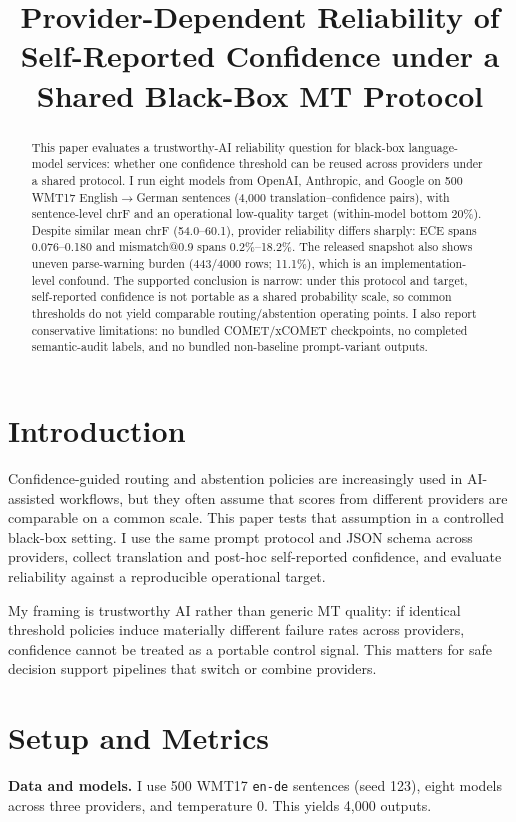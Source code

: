 \documentclass[10pt,conference]{IEEEtran}
\title{Provider-Dependent Reliability of Self-Reported Confidence under a Shared Black-Box MT Protocol}
\author{\IEEEauthorblockN{Umberto Altieri}}
\begin{document}
\maketitle

\begin{abstract}
This paper evaluates a trustworthy-AI reliability question for black-box language-model services: whether one confidence threshold can be reused across providers under a shared protocol. I run eight models from OpenAI, Anthropic, and Google on 500 WMT17 English$\rightarrow$German sentences (4,000 translation--confidence pairs), with sentence-level chrF and an operational low-quality target (within-model bottom 20\%). Despite similar mean chrF (54.0--60.1), provider reliability differs sharply: ECE spans 0.076--0.180 and mismatch@0.9 spans 0.2\%--18.2\%. The released snapshot also shows uneven parse-warning burden (443/4000 rows; 11.1\%), which is an implementation-level confound. The supported conclusion is narrow: under this protocol and target, self-reported confidence is not portable as a shared probability scale, so common thresholds do not yield comparable routing/abstention operating points. I also report conservative limitations: no bundled COMET/xCOMET checkpoints, no completed semantic-audit labels, and no bundled non-baseline prompt-variant outputs.
\end{abstract}

\section{Introduction}
Confidence-guided routing and abstention policies are increasingly used in AI-assisted workflows, but they often assume that scores from different providers are comparable on a common scale. This paper tests that assumption in a controlled black-box setting. I use the same prompt protocol and JSON schema across providers, collect translation and post-hoc self-reported confidence, and evaluate reliability against a reproducible operational target.

My framing is trustworthy AI rather than generic MT quality: if identical threshold policies induce materially different failure rates across providers, confidence cannot be treated as a portable control signal. This matters for safe decision support pipelines that switch or combine providers.

\section{Setup and Metrics}
\textbf{Data and models.} I use 500 WMT17 \texttt{en-de} sentences (seed 123), eight models across three providers, and temperature 0. This yields 4,000 outputs.
\end{document}
